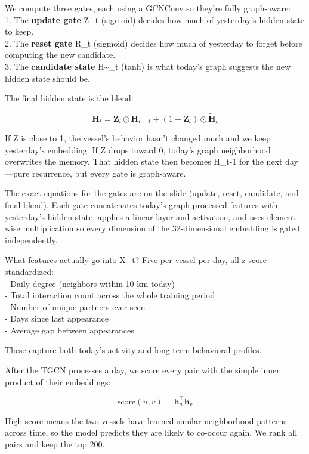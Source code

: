 \documentclass[
]{article}
\begin{document}
We compute three gates, each using a GCNConv so they're fully
graph-aware:\\
1. The \textbf{update gate} Z\_t (sigmoid) decides how much of
yesterday's hidden state to keep.\\
2. The \textbf{reset gate} R\_t (sigmoid) decides how much of yesterday
to forget before computing the new candidate.\\
3. The \textbf{candidate state} H\textasciitilde\_t (tanh) is what
today's graph suggests the new hidden state should be.

The final hidden state is the blend:

\[
\mathbf{H}_t = \mathbf{Z}_t \odot \mathbf{H}_{t-1} + (1 - \mathbf{Z}_t) \odot \tilde{\mathbf{H}}_t
\]

If Z is close to 1, the vessel's behavior hasn't changed much and we
keep yesterday's embedding. If Z drops toward 0, today's graph
neighborhood overwrites the memory. That hidden state then becomes
H\_t-1 for the next day---pure recurrence, but every gate is
graph-aware.

The exact equations for the gates are on the slide (update, reset,
candidate, and final blend). Each gate concatenates today's
graph-processed features with yesterday's hidden state, applies a linear
layer and activation, and uses element-wise multiplication so every
dimension of the 32-dimensional embedding is gated independently.

What features actually go into X\_t? Five per vessel per day, all
z-score standardized:\\
- Daily degree (neighbors within 10 km today)\\
- Total interaction count across the whole training period\\
- Number of unique partners ever seen\\
- Days since last appearance\\
- Average gap between appearances

These capture both today's activity and long-term behavioral profiles.

After the TGCN processes a day, we score every pair with the simple
inner product of their embeddings:

\[
\text{score}(u,v) = \mathbf{h}_u^\top \mathbf{h}_v
\]

High score means the two vessels have learned similar neighborhood
patterns across time, so the model predicts they are likely to co-occur
again. We rank all pairs and keep the top 200.
\end{document}
